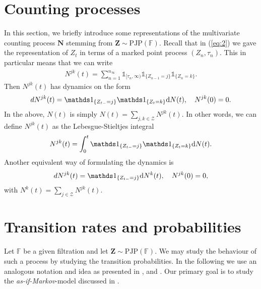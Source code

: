 \documentclass[12pt,letter,twoside]{article}
\theoremstyle{plain}
\theoremstyle{definition}
\theoremstyle{remark}
\begin{document}
\section{Counting processes}
In this section, we briefly introduce some representations of the multivariate counting process $\mathbf N$ stemming from $\mathbf Z\sim \text{PJP}(\mathbb F)$. Recall that in (\ref{eq:2}) we gave the representation of $Z_t$ in terms of a marked point process $(Z_n,\tau_n)$. This in particular means that we can write
\begin{align}
N^{jk}(t)=\sum_{n=1}^{n_\infty}\mathds 1_{[\tau_n,\infty)} \mathds 1_{\{Z_{n-1}=j\}}\mathds 1_{\{Z_{n}=k\}}.
\end{align}
Then $N^{jk}(t)$ has dynamics on the form
\begin{align}
dN^{jk}(t)=\mathds 1_{\{Z_{t-}=j\}}\mathds 1_{\{Z_{t}=k\}}\text dN(t),\quad N^{jk}(0)=0.
\end{align}
In the above, $N(t)$ is simply $N(t)=\sum_{j,k\in \mathcal Z} N^{jk}(t)$. In other words, we can define $N^{jk}(t)$ as the Lebesgue-Stieltjes integral
\begin{align}\label{eq:3}
N^{jk}(t)=\int_0^t \mathds 1_{\{Z_{t-}=j\}}\mathds 1_{\{Z_{t}=k\}}\text dN(t).
\end{align}
Another equivalent way of formulating the dynamics is
\begin{align}
dN^{jk}(t)=\mathds 1_{\{Z_{t-}=j\}}\text dN^k(t),\quad N^{jk}(0)=0,
\end{align}
with $N^k(t)=\sum_{j\in \mathcal Z}N^{jk}(t)$.

\section{Transition rates and probabilities}
Let $\mathbb F$ be a given filtration and let $\mathbf Z\sim \text{PJP}(\mathbb F)$. We may study the behaviour of such a process by studying the transition probabilities. In the following we use an analogous notation and idea as presented in \cite{furrerbladt2023}, \cite{Christiansen2021} and \cite{Christiansen2022}. Our primary goal is to study the \textit{as-if-Markov}-model discussed in \cite{Christiansen2022}.
\end{document}
